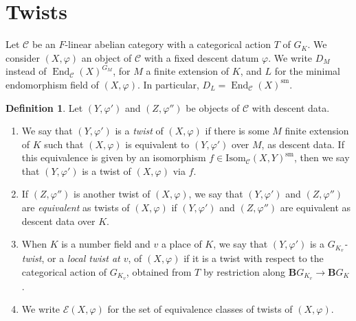 \documentclass[a4paper,10pt]{amsart}
\theoremstyle{plain}
\theoremstyle{definition}
\newtheorem{definition}[theorem]{Definition}
\theoremstyle{remark}
\def\mr#1{\mathrm{#1}}
\def\Ccal{\mathcal{C}}
\def\Bbf{\mathbf{B}}
\newcommand{\bD}{D_L}
\DeclareMathOperator{\End}{End}
\begin{document}
\section{Twists}
Let \(\Ccal\) be an \(F\)-linear abelian category with a categorical action \(T\) of \(G_K\). We consider \((X, \varphi)\) an object of \(\Ccal\) with a fixed descent datum \(\varphi\). We write \(D_M\) instead of \(\End_{\Ccal}(X)^{G_M}\), for \(M\) a finite extension of \(K\), and \(L\) for the minimal endomorphism field of \((X, \varphi)\). In particular, \(\bD = \End_{\Ccal}(X)^\mr{sm}\).
\begin{definition}\label{def: general twist}
Let \((Y, \varphi')\) and \((Z, \varphi'')\) be objects of \(\Ccal\) with descent data.
\begin{enumerate}
\item We say that \((Y, \varphi')\) is a \emph{twist} of \((X, \varphi)\) if there is some \(M\) finite extension of \(K\) such that \((X, \varphi)\) is equivalent to \((Y, \varphi')\) over \(M\), as descent data. If this equivalence is given by an isomorphism \(f \in \mr{Isom}_{\Ccal}(X, Y)^\mr{sm}\), then we say that \((Y, \varphi')\) is a twist of \((X, \varphi)\) via \(f\).

\item If \((Z, \varphi'')\) is another twist of \((X, \varphi)\), we say that \((Y, \varphi')\) and \((Z, \varphi'')\) are \emph{equivalent} as twists of \((X, \varphi)\) if \((Y, \varphi')\) and \((Z, \varphi'')\) are equivalent as descent data over \(K\).

\item When \(K\) is a number field and \(v\) a place of \(K\), we say that \((Y, \varphi')\) is a \emph{\(G_{K_v}\)-twist}, or a \emph{local twist at \(v\)}, of \((X, \varphi)\) if it is a twist with respect to the categorical action of \(G_{K_v}\), obtained from \(T\) by restriction along \(\Bbf G_{K_v} \to \Bbf G_K\).

\item We write \(\mathcal{E}(X, \varphi)\) for the set of equivalence classes of twists of \((X, \varphi)\).
\end{enumerate}
\end{definition}
\end{document}
